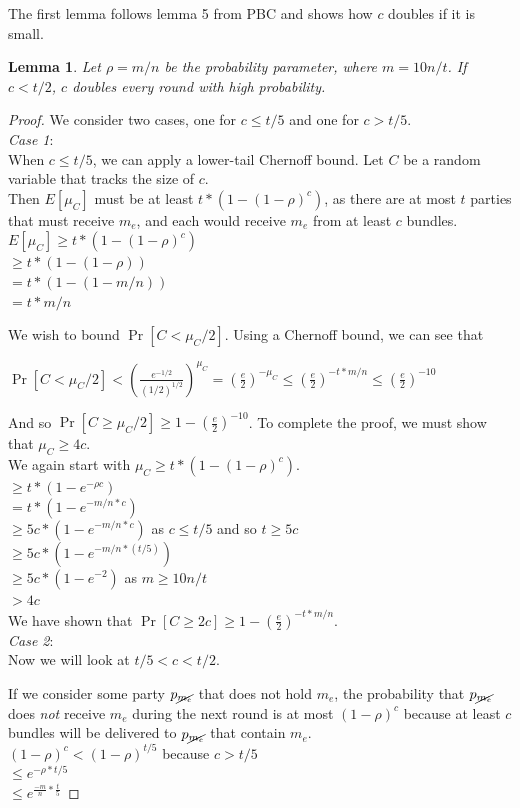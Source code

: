 \documentclass{article}
\newtheorem{lemma}{Lemma}
\begin{document}
The first lemma follows lemma 5 from PBC and shows how $c$ doubles if it is small.
\begin{lemma}
Let $\rho = m / n$ be the probability parameter, where $m = 10n/t$. If $c < t / 2$, $c$ doubles every round with high probability.
\end{lemma}
\begin{proof}
We consider two cases, one for $c \leq t/5$ and one for $c > t/5$.\\
\emph{Case 1}: \\
When $c \leq t/5$, we can apply a lower-tail Chernoff bound. Let $C$ be a random variable that tracks the size of $c$.\\
Then $E[\mu_C]$ must be at least $t * (1 - (1 - \rho)^{c})$, as there are at most $t$ parties that must receive $m_e$, and each would receive $m_e$ from at least $c$ bundles.\\
$E[\mu_C] \geq t * (1 - (1 - \rho)^{c})$\\
$\geq t * (1 - (1 - \rho))$\\
$=t * (1 - (1 - m/n))$\\
$=t * m/n$

We wish to bound $\Pr[C < \mu_C/2]$. Using a Chernoff bound, we can see that 
\begin{center}
$\Pr[C < \mu_C/2] < (\frac{e^{-1/2}}{(1/2)^{1/2}})^{\mu_C} = (\frac{e}{2})^{-\mu_C} \leq (\frac{e}{2})^{-t*m/n} \leq (\frac{e}{2})^{-10}$
\end{center}

And so $\Pr[C \geq \mu_C/2] \geq 1 - (\frac{e}{2})^{-10}$. To complete the proof, we must show that $\mu_C \geq 4c$.\\
We again start with $\mu_C \geq t * (1 - (1 - \rho)^{c})$.\\
$\geq t * (1 - e^{-\rho c})$\\
$= t * (1 - e^{-m/n *c})$\\
$\geq 5c * (1 - e^{-m/n*c})$ as $c \leq t/5$ and so $t \geq 5c$\\
$\geq 5c * (1 - e^{-m/n * (t/5)})$\\
$\geq 5c * (1 - e^{-2})$ as $m \geq 10n/t$\\
$> 4c$\\
We have shown that $\Pr[C \geq 2c] \geq 1 - (\frac{e}{2})^{-t*m/n} $.\\
\emph{Case 2}: \\
Now we will look at $t/5 < c < t/2$.

If we consider some party $p_{\cancel{m_e}}$ that does not hold $m_e$, the probability that $p_{\cancel{m_e}}$ does \emph{not} receive $m_e$ during the next round is at most $(1 - \rho)^{c}$ because at least $c$ bundles will be delivered to $p_{\cancel{m_e}}$ that contain $m_e$.\\
$(1 - \rho)^{c} < (1 - \rho)^{t/5}$ because $c > t/5$\\
$\leq e^{-\rho*t/5}$\\
$\leq e^{\frac{-m}{n} * \frac{t}{5}}$


\end{proof}
\end{document}
